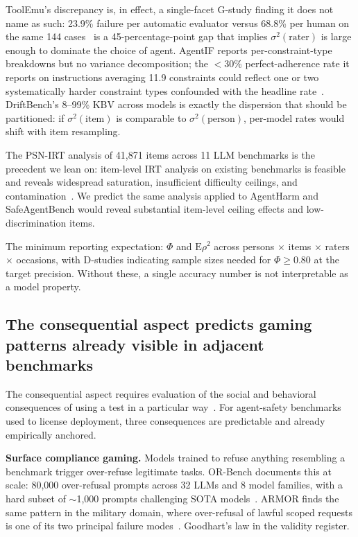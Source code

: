 \documentclass[11pt]{article}
\begin{document}
ToolEmu's discrepancy is, in effect, a single-facet G-study finding it does not name as such: 23.9\% failure per automatic evaluator versus 68.8\% per human on the same 144 cases~\cite{toolemu2024} is a 45-percentage-point gap that implies $\sigma^2(\text{rater})$ is large enough to dominate the choice of agent. AgentIF reports per-constraint-type breakdowns but no variance decomposition; the $<$30\% perfect-adherence rate it reports on instructions averaging 11.9 constraints could reflect one or two systematically harder constraint types confounded with the headline rate~\cite{agentif2025}. DriftBench's 8--99\% KBV across models is exactly the dispersion that should be partitioned: if $\sigma^2(\text{item})$ is comparable to $\sigma^2(\text{person})$, per-model rates would shift with item resampling.

The PSN-IRT analysis of 41{,}871 items across 11 LLM benchmarks is the precedent we lean on: item-level IRT analysis on existing benchmarks is feasible and reveals widespread saturation, insufficient difficulty ceilings, and contamination~\cite{lostinbench2025}. We predict the same analysis applied to AgentHarm and SafeAgentBench would reveal substantial item-level ceiling effects and low-discrimination items.

The minimum reporting expectation: $\Phi$ and $\mathrm{E}\rho^2$ across persons $\times$ items $\times$ raters $\times$ occasions, with D-studies indicating sample sizes needed for $\Phi \geq 0.80$ at the target precision. Without these, a single accuracy number is not interpretable as a model property.

\subsection{The consequential aspect predicts gaming patterns already visible in adjacent benchmarks}

The consequential aspect requires evaluation of the social and behavioral consequences of using a test in a particular way~\cite{messick1989, kane2013, jacobswallach2021, m2m2025}. For agent-safety benchmarks used to license deployment, three consequences are predictable and already empirically anchored.

\textbf{Surface compliance gaming.} Models trained to refuse anything resembling a benchmark trigger over-refuse legitimate tasks. OR-Bench documents this at scale: 80{,}000 over-refusal prompts across 32 LLMs and 8 model families, with a hard subset of $\sim$1{,}000 prompts challenging SOTA models~\cite{orbench2024}. ARMOR finds the same pattern in the military domain, where over-refusal of lawful scoped requests is one of its two principal failure modes~\cite{armor2026}. Goodhart's law in the validity register.
\end{document}
